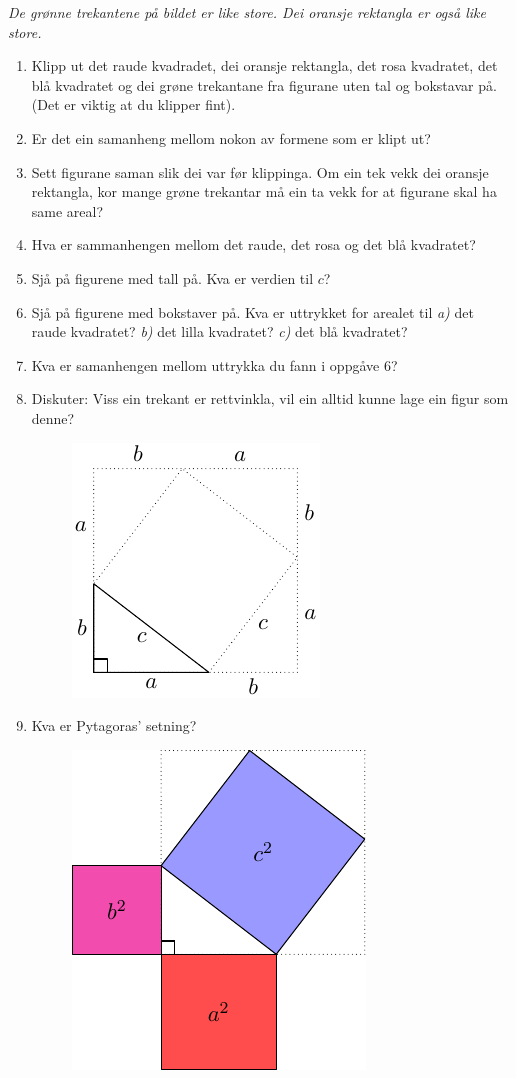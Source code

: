 \documentclass[english, 12 pt]{report}
\begin{document}
\textsl{De grønne trekantene på bildet er like store. Dei oransje rektangla er også like store.}
\begin{enumerate}
	\item Klipp ut det raude kvadradet, dei oransje rektangla, det rosa kvadratet, det blå kvadratet og dei grøne trekantane fra figurane uten tal og bokstavar på. (Det er viktig at du klipper fint).
	\item Er det ein samanheng mellom nokon av formene som er klipt ut?
	\item Sett figurane saman slik dei var før klippinga. Om ein tek vekk dei oransje rektangla, kor mange grøne trekantar må ein ta vekk for at figurane skal ha same areal?
	\item Hva er sammanhengen mellom det raude, det rosa og det blå kvadratet?
	\item Sjå på figurene med tall på. Kva er verdien til $ c $?
	\item Sjå på figurene med bokstaver på. Kva er uttrykket for arealet til \textsl{a)} det raude kvadratet? \textsl{b)} det lilla kvadratet? \textsl{c)} det blå kvadratet?
	\item Kva er samanhengen mellom uttrykka du fann i oppgåve 6?
	\item Diskuter: Viss ein trekant er rettvinkla, vil ein alltid kunne lage ein figur som denne?
		\begin{figure}[hbt]
		\centering
		\includegraphics[]{pyt}
	\end{figure}
	\item Kva er Pytagoras' setning?
			\begin{figure}[hbt]
		\centering
		\includegraphics[]{pyb}
	\end{figure}
\end{enumerate}
\end{document}
